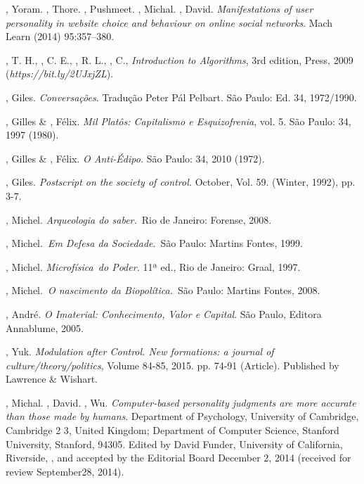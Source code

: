\begin{Parskip}
, Yoram. , Thore. , Pushmeet. , Michal.
, David. \emph{Manifestations of user personality in website
choice and behaviour on online social networks}. Mach Learn (2014) 95:357--380.

, T. H., , C. E., , R. L., , C.,
\emph{Introduction to Algorithms}, 3rd edition,  Press, 2009
(\emph{https://bit.ly/2UJxjZL}).

, Giles. \emph{Conversações}. Tradução Peter Pál Pelbart. São Paulo: Ed. 34,  1972/1990.

, Gilles \& , Félix. \emph{Mil Platôs: Capitalismo e
Esquizofrenia}, vol. 5. São Paulo: 34, 1997 (1980).

, Gilles \& , Félix. \emph{O Anti-Édipo.} São Paulo:
34, 2010 (1972).

, Giles. \emph{Postscript on the society of control.} October,
Vol. 59. (Winter, 1992), pp. 3-7.

, Michel. \emph{Arqueologia do saber.}~Rio de Janeiro:
Forense, 2008.

, Michel.~\emph{Em Defesa da Sociedade}.~São Paulo: Martins
Fontes, 1999.

, Michel. \emph{Microfísica~do Poder.} 11ª ed., Rio de
Janeiro: Graal, 1997.

, Michel.~\emph{O nascimento da Biopolítica.}~São Paulo:
Martins Fontes, 2008.

, André. \emph{O Imaterial: Conhecimento, Valor e Capital}. São
Paulo, Editora Annablume, 2005.

, Yuk. \emph{Modulation after Control. New formations: a journal of
culture/theory/politics}, Volume 84-85, 2015. pp. 74-91 (Article).
Published by Lawrence \& Wishart.

, Michal. , David. , Wu. \emph{Computer-based
personality judgments are more accurate than those made by
humans}. Department of Psychology, University of Cambridge, Cambridge 2
3, United Kingdom; Department of Computer Science, Stanford
University, Stanford,  94305. Edited by David Funder, University of
California, Riverside, , and accepted by the Editorial Board December
2, 2014 (received for review September28, 2014).


\end{Parskip}
